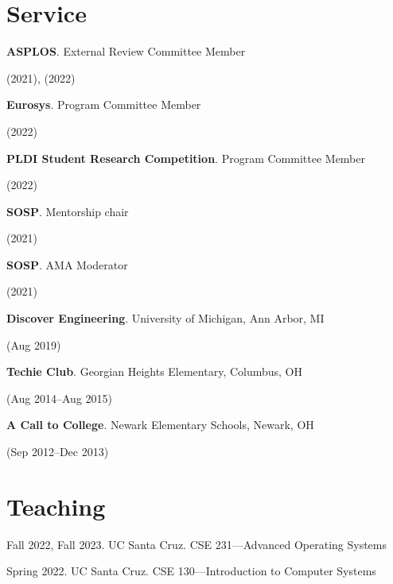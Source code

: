 \documentclass[letterpaper,10pt]{article}
\newcommand{\sidebyside}[2]{
  \begin{minipage}[t]{.75\textwidth}
    \raggedright{}
    #2
  \end{minipage}
  \hspace{.01\textwidth}
    \begin{minipage}[t]{.205\textwidth}
    \raggedleft
    #1
  \end{minipage}
}
\newcommand{\trio}[3]{\sidebyside{#3}{\textbf{#1}. #2}}
\begin{document}
\section{Service}
\begin{smenumerate}
\item\trio{ASPLOS}{External Review Committee Member}{(2021), (2022)}
\item\trio{Eurosys}{Program Committee Member}{(2022)}
\item\trio{PLDI Student Research Competition}{Program Committee Member}{(2022)}
\item\trio{SOSP}{Mentorship chair}{(2021)}
\item\trio{SOSP}{AMA Moderator}{(2021)}
\item\trio{Discover Engineering}{University of Michigan, Ann Arbor, MI}{(Aug 2019)}
\item\trio{Techie Club}{Georgian Heights Elementary, Columbus, OH}{(Aug 2014--Aug 2015)}
\item\trio{A Call to College}{Newark Elementary Schools, Newark, OH}{(Sep 2012--Dec 2013)}
\end{smenumerate}




\section{Teaching}
\begin{smenumerate}
\item Fall 2022, Fall 2023. UC Santa Cruz. CSE 231---Advanced Operating Systems
\item Spring 2022. UC Santa Cruz. CSE 130---Introduction to Computer Systems
\end{smenumerate}
\end{document}

